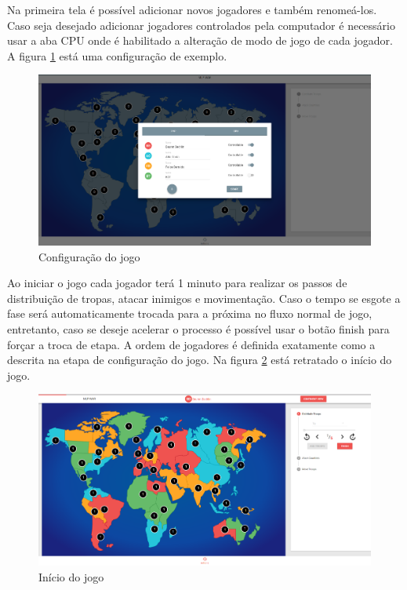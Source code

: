 \documentclass[rel_mlp]{iiufrgs}
\begin{document}
Na primeira tela é possível adicionar novos jogadores e também renomeá-los. 
Caso seja desejado adicionar jogadores controlados pela computador é necessário usar a aba CPU onde é habilitado a alteração de modo de jogo de cada jogador. 
A figura \ref{fig:setup} está uma configuração de exemplo.

\begin{figure}[h!]
\centering
  \includegraphics[width=1.0\textwidth]{images/setup.png}
  \caption{Configuração do jogo}
  \label{fig:setup}
\end{figure}

Ao iniciar o jogo cada jogador terá 1 minuto para realizar os passos de distribuição de tropas, atacar inimigos e movimentação. Caso o tempo se esgote a fase será automaticamente trocada para a próxima no fluxo normal de jogo, entretanto, caso se deseje acelerar o processo é possível usar o botão finish para forçar a troca de etapa.
A ordem de jogadores é definida exatamente como a descrita na etapa de configuração do jogo. 
Na figura \ref{fig:initGame} está retratado o início do jogo.

\begin{figure}[h!]
\centering
  \includegraphics[width=1.0\textwidth]{images/initGame.png}
  \caption{Início do jogo}
  \label{fig:initGame}
\end{figure}
\end{document}
